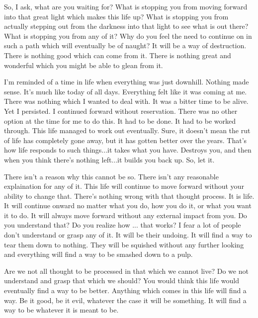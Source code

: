 So, I ask, what are you waiting for? What is stopping you from moving forward
into that great light which makes this life up? What is stopping you from
actually stepping out from the darkness into that light to see what is out
there? What is stopping you from any of it? Why do you feel the need to continue
on in such a path which will eventually be of naught? It will be a way of
destruction. There is nothing good which can come from it. There is nothing
great and wonderful which you might be able to glean from it.

I'm reminded of a time in life when everything was just downhill. Nothing made
sense. It's much like today of all days. Everything felt like it was coming at
me. There was nothing which I wanted to deal with. It was a bitter time to be
alive. Yet I persisted. I continued forward without reservation. There was no
other option at the time for me to do this. It had to be done. It had to be
worked through. This life managed to work out eventually. Sure, it doesn't mean
the rut of life has completely gone away, but it has gotten better over the
years. That's how life responds to such things...it takes what you have.
Destroys you, and then when you think there's nothing left...it builds you back
up. So, let it.

There isn't a reason why this cannot be so. There isn't any reasonable
explaination for any of it. This life will continue to move forward without your
ability to change that. There's nothing wrong with that thought process. It is
life. It will continue onward no matter what you do, how you do it, or what you
want it to do. It will always move forward without any external impact from you.
Do you understand that? Do you realize how ... that works? I fear a lot of
people don't understand or grasp any of it. It will be their undoing. It will
find a way to tear them down to nothing. They will be squished without any
further looking and everything will find a way to be smashed down to a pulp.

Are we not all thought to be processed in that which we cannot live? Do we not
understand and grasp that which we should? You would think this life would
eventually find a way to be better. Anything which comes in this life will find
a way. Be it good, be it evil, whatever the case it will be something. It will
find a way to be whatever it is meant to be.
